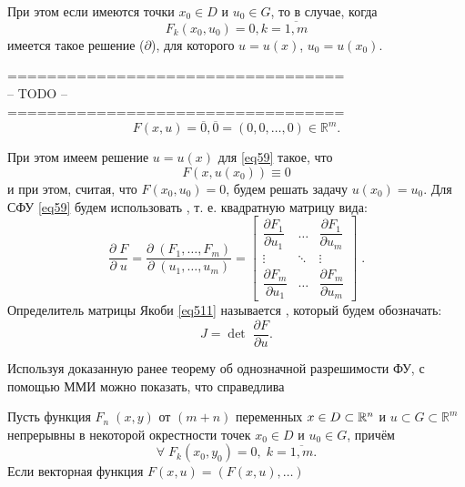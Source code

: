 При этом если имеются точки $ x_0 \in D $ и $ u_0 \in G $, то в случае, когда
\begin{equation}
    F_k(x_0, u_0) = 0, k = \overline{ 1, m} 
\end{equation}
имеется такое решение ($ \partial $), для которого $ u = u(x) $, $ u_0 = u(x_0) $.

$  $\\
==================================\\
-- TODO --\\
==================================\\


\begin{equation}
    \label{eq59}
    F(x, u) = \overline{0}, \overline{0} = (0, 0, \ldots, 0) \in \mathbb{R}^{m}.
\end{equation}

При этом имеем решение $ u = u(x) $ для \eqref{eq59} такое, что
\begin{equation}
    F(x, u(x_0)) \equiv 0
\end{equation}
и при этом, считая, что $ F(x_0, u_0) = 0 $, будем решать задачу $ u(x_0) = u_0 $.
Для СФУ \eqref{eq59} будем использовать , т. е. квадратную матрицу вида:
\begin{equation}
    \label{eq511}
    \dfrac{\partial \; F}{\partial \; u}   = 
    \dfrac{\partial \; (F_1, \ldots, F_m)}{\partial \; (u_1, \ldots, u_m)}   =    
    \left[ 
    \begin{matrix}
        \dfrac{\partial F_1 }{\partial  u_1 } & \ldots & \dfrac{\partial F_1 }{\partial  u_m } \\
        \vdots & \ddots & \vdots \\
        \dfrac{\partial F_m }{\partial  u_1 } & \ldots & \dfrac{\partial F_m }{\partial  u_m }
    \end{matrix}
    \right]
    \; .
\end{equation}
Определитель матрицы Якоби \eqref{eq511} называется , который будем обозначать:
\begin{equation}
    J = \det \; \dfrac{\partial F}{\partial u}.
\end{equation}

Используя доказанную ранее теорему об однозначной разрешимости ФУ, с помощью ММИ можно показать, что справедлива
\begin{theorem}
\end{theorem}
Пусть функция $ F_n \; (x,y) $ от $ (m+n) $ переменных $ x \in D  \subset \mathbb{R}^n $ и ${ u \subset G \subset \mathbb{R}^m }$ непрерывны в некоторой окрестности точек $ x_0 \in D $ и $ u_0 \in G $, причём
\begin{equation}
    \forall \; F_k (x_0, y_0) = 0, \; k = \overline{1, m}.
\end{equation}
Если векторная функция $ F(x, u) = (F(x, u), \ldots) $


